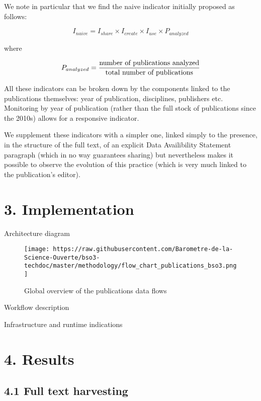\documentclass[
]{article}
\begin{document}
We note in particular that we find the naive indicator initially
proposed as follows:

\[ I_{naive} = I_{share} \times I_{create} \times I_{use} \times P_{analyzed} \]

where

\[ P_{analyzed} = {\text{number of publications analyzed} \over \text{total number of publications}} \]

All these indicators can be broken down by the components linked to the
publications themselves: year of publication, disciplines, publishers
etc. Monitoring by year of publication (rather than the full stock of
publications since the 2010s) allows for a responsive indicator.

We supplement these indicators with a simpler one, linked simply to the
presence, in the structure of the full text, of an explicit Data
Availibility Statement paragraph (which in no way guarantees sharing)
but nevertheless makes it possible to observe the evolution of this
practice (which is very much linked to the publication's editor).

\newpage

\hypertarget{implementation}{%
\section{3. Implementation}\label{implementation}}

Architecture diagram

\begin{figure}
\centering
\texttt{[image: https://raw.githubusercontent.com/Barometre-de-la-Science-Ouverte/bso3-techdoc/master/methodology/flow\_chart\_publications\_bso3.png]}
\caption{Global overview of the publications data flows}
\end{figure}

Workflow description

Infrastructure and runtime indications

\hypertarget{results}{%
\section{4. Results}\label{results}}

\hypertarget{full-text-harvesting}{%
\subsection{4.1 Full text harvesting}\label{full-text-harvesting}}
\end{document}
